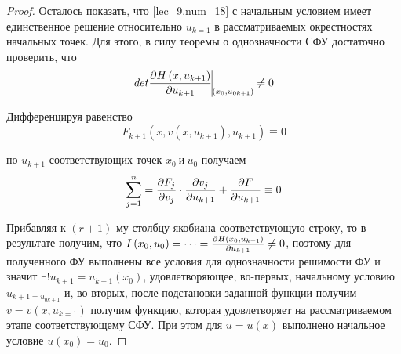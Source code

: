 \documentclass[../../main.tex]{subfiles}
\begin{document}
\begin{proof}
    Осталось показать, что \eqref{lec_9.num_18} с начальным
    условием имеет единственное решение относительно 
    $u_{k=1}$ в рассматриваемых окрестностях начальных
    точек. Для этого, в силу теоремы о однозначности СФУ
    достаточно проверить, что
    \begin{equation}
    \label{lec_9.num_20}
    det\pderiv{H\left(x, u_{k+1}\right)}{u_{k+1}} 
    \vline\underset{\left(x_0, u_{0k+1}\right)}{} \neq 0
    \end{equation}
    
    Дифференцируя равенство
    \begin{equation}
    \label{lec_9.num_21}
    F_{k+1}\left(x, v\left(x, u_{k+1}\right), 
    u_{k+1}\right) \equiv 0
    \end{equation}
    
    по $u_{k+1}$ соответствующих точек $x_0\ \text{и}\ u_0$
    получаем
    \begin{equation}
        \label{lec_9.num_22}
        \sum_{j = 1}^{n} = 
        \frac{\partial F_j}{\partial v_j} \cdot \frac{\partial v_j}{\partial u_{k+1}} + 
        \frac{\partial F}{\partial u_{k+1}} \equiv 0
    \end{equation}
    
    Прибавляя к $\left(r + 1\right)$-му столбцу 
    якобиана соответствующую строку, то в результате
    получим, что 
    $I\left(x_0, u_0\right)= \dots = 
    \frac{\partial H\left(x_0,u_{k+1}\right)}{\partial u_{k+1}} \neq 0$,
    поэтому для полученного ФУ выполнены все условия для 
    однозначности решимости ФУ и значит 
    $\exists! u_{k+1} = u_{k+1}\left(x_0\right)$, 
    удовлетворяющее, во-первых, начальному условию
    $u_{k+1 = u_{0k+1}}$ и, во-вторых, после подстановки
    заданной функции получим 
    $v = v\left(x, u_{k=1}\right)$ получим функцию,
    которая удовлетворяет на рассматриваемом этапе
    соответствующему СФУ.
    При этом для $u = u\left(x\right)$ выполнено начальное
    условие $u\left(x_0\right) = u_0$.
\end{proof}
\end{document}
